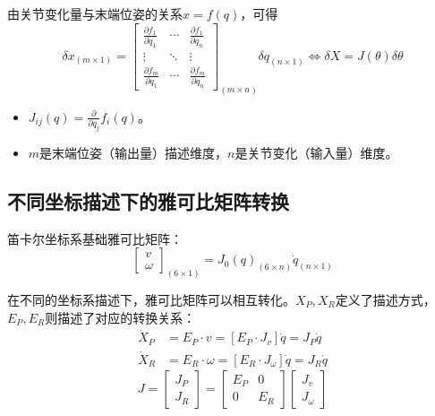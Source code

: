 \documentclass[
12pt, %
a4paper, 
oneside, %
headinclude,footinclude, %
]{scrartcl}
\begin{document}
由关节变化量与末端位姿的关系$ x = f(q) $，可得
$$
\delta x_{(m \times 1)} = 
\begin{bmatrix}
\frac{\partial f_1}{\partial q_1} & \cdots & \frac{\partial f_1}{\partial q_n} \\
\vdots & \ddots & \vdots \\
\frac{\partial f_m}{\partial q_1} & \cdots & \frac{\partial f_m}{\partial q_n}
\end{bmatrix}_{(m \times n)}
\delta q_{(n \times 1)}
\Leftrightarrow 
\delta X = J(\theta)\delta \theta
$$
\begin{itemize}
\item $ J_{ij}(q) = \frac{\partial}{\partial q_j} f_i(q) $。
\item $ m $是末端位姿（输出量）描述维度，$ n $是关节变化（输入量）维度。
\end{itemize} 
\subsection{不同坐标描述下的雅可比矩阵转换}
笛卡尔坐标系基础雅可比矩阵：
$$ \begin{bmatrix} v \\ \omega \end{bmatrix}_{(6 \times 1)} = J_0(q)_{(6 \times n)} \dot{q}_{(n \times 1)} $$

在不同的坐标系描述下，雅可比矩阵可以相互转化。$ X_P,X_R $定义了描述方式，$ E_P,E_R $则描述了对应的转换关系：
\begin{align*}
\dot{X}_P &= E_P \cdot v = [E_P \cdot J_v] \dot{q} = J_P \dot{q} \\
\dot{X}_R &= E_R \cdot \omega = [E_R \cdot J_\omega] \dot{q} = J_R \dot{q}
\end{align*}
$$
J = 
\begin{bmatrix} J_P \\ J_R \end{bmatrix}
=
\begin{bmatrix} E_P & 0 \\ 0 & E_R \end{bmatrix}
\begin{bmatrix} J_v \\ J_\omega \end{bmatrix}
$$
\end{document}

